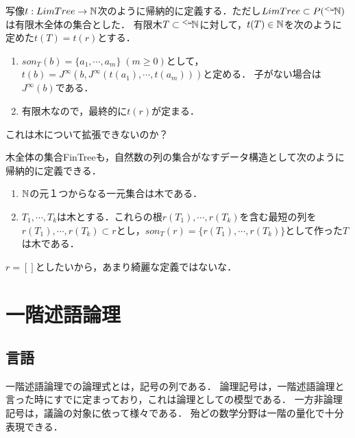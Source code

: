\documentclass[uplatex, dvipdfmx]{jsreport}
\begin{document}
\begin{definition}[有限木の自然数によるコード]
    写像$t:LimTree \to \mathbb{N}$次のように帰納的に定義する．ただし$LimTree\subset P({}^{<\omega}\!\mathbb{N})$は有限木全体の集合とした．
    有限木$T\subset{}^{<\omega}\!\mathbb{N}$に対して，$t(T)\in\mathbb{N}$を次のように定めた$t(T)=t(r)$とする．
    \begin{enumerate}
        \item $son_T(b)=\{a_1,\cdots,a_m\}\;(m\ge 0)$として，$t(b)=J^\infty(b,J^\infty(t(a_1),\cdots,t(a_m)))$と定める．
        子がない場合は$J^\infty(b)$である．
        \item 有限木なので，最終的に$t(r)$が定まる．
    \end{enumerate}
\end{definition}
\begin{remark}
    これは木について拡張できないのか？
\end{remark}
\begin{remark}
    木全体の集合FinTreeも，自然数の列の集合がなすデータ構造として次のように帰納的に定義できる．
    \begin{enumerate}
        \item $\mathbb{N}$の元１つからなる一元集合は木である．
        \item $T_1,\cdots,T_k$は木とする．これらの根$r(T_1),\cdots,r(T_k)$を含む最短の列を$r(T_1),\cdots,r(T_k)\subset r$とし，$son_T(r)=\{r(T_1),\cdots,r(T_k)\}$として作った$T$は木である．
    \end{enumerate}
    $r=[]$としたいから，あまり綺麗な定義ではないな．
\end{remark}

\section{一階述語論理}

\subsection{言語}

\begin{screen}
    一階述語論理での論理式とは，記号の列である．
    論理記号は，一階述語論理と言った時にすでに定まっており，これは論理としての模型である．
    一方非論理記号は，議論の対象に依って様々である．
    殆どの数学分野は一階の量化で十分表現できる．
\end{screen}
\end{document}
